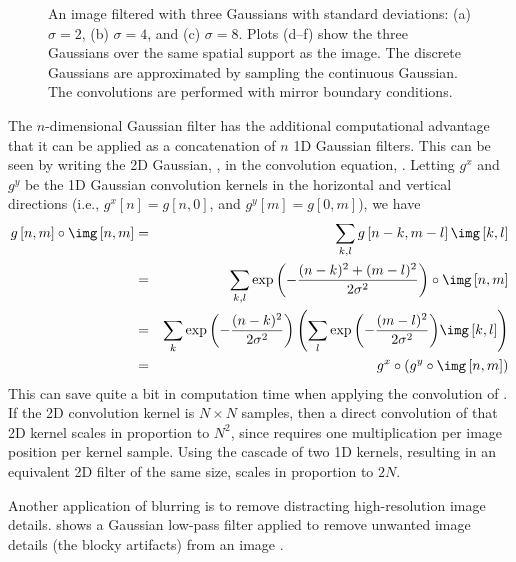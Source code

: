 \begin{figure}[t]
{%
}
\caption{An image filtered with three Gaussians with standard deviations: (a) $\sigma=2$, (b) $\sigma=4$, and (c) $\sigma=8$. Plots (d--f) show the three Gaussians over the same spatial support as the image. The discrete Gaussians are approximated by sampling the continuous Gaussian. The convolutions are performed with mirror boundary conditions.} 
\label{fig:zebragaussian}
\end{figure}


The $n$-dimensional Gaussian filter has the additional computational advantage that it can
be applied as a concatenation of $n$ 1D Gaussian filters.  This can be
seen by writing the 2D Gaussian, \eqn{\ref{eq:gauss2d}}, in the
convolution equation, \eqn{\ref{eq:2dconv}}.  Letting $g^x$
and $g^y$ be the 1D Gaussian convolution kernels in the horizontal
and vertical directions (i.e., $g^x [n]=g[n,0]$, and $g^y[m]=g[0,m]$), we have
\begin{eqnarray*}
g \left[n,m \right] \circ \img \left[n,m\right] 
& = & \sum_{k,l}
g \left[n-k,m-l \right] \img \left[k,l \right] \\
& = & \sum_{k,l}
\exp{ \left( -\frac{(n-k)^2 + (m-l)^2}{2 \sigma^2} \right) }
\circ \img \left[n,m \right] \\
& = & 
\sum_{k}
\exp{ \left( -\frac{(n-k)^2}{2 \sigma^2} \right) }
\left(
\sum_{l}
 \exp{ \left( -\frac{(m-l)^2}{2 \sigma^2} \right) } \img \left[k,l \right] 
 \right)
 \\
& = &
g^x \circ (g^y \circ \img \left[n,m \right])
\label{eq:2dgauss}
\end{eqnarray*}
This can save quite a bit in computation time when applying the
convolution of \eqn{\ref{eq:2dgauss}}.  If the 2D convolution kernel
is $N \times N$ samples, then a direct convolution of that 2D kernel scales
in proportion to $N^2$, since \eqn{\ref{eq:2dgauss}} requires one
multiplication per image position per kernel sample.  Using the
cascade of two 1D kernels, resulting in an equivalent 2D filter of
the same size, scales in proportion to $2N$.

Another application of blurring is to remove distracting
high-resolution image details.  
\Fig{\ref{fig:lincoln}} shows a Gaussian low-pass filter applied to
remove unwanted image details (the blocky artifacts) from an image \cite{Harmon_1973}.

